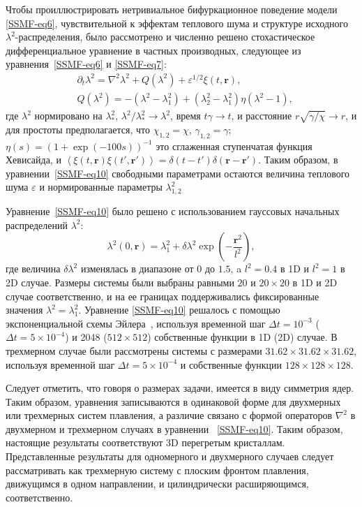 Чтобы проиллюстрировать нетривиальное бифуркационное поведение модели \eqref{SSMF-eq6}, чувствительной к эффектам теплового шума и структуре исходного $\lambda^2$-распределения, было рассмотрено и численно решено стохастическое дифференциальное уравнение в частных производных, следующее из уравнения~\eqref{SSMF-eq6} и \eqref{SSMF-eq7}:
\begin{equation}
\label{SSMF-eq10}
\begin{split}
& \partial_t \lambda^2 = \nabla^2\lambda^2 + Q (\lambda^2) +  \varepsilon^{1/2}\xi(t,\mathbf{r}), \\
& Q(\lambda^2) = -(\lambda^2-\lambda_1^2) + (\lambda_2^2-\lambda_1^2)\eta(\lambda^2-1),
\end{split}
\end{equation}
где $\lambda^2$ нормировано на $\lambda_\ast^2$, $\lambda^2/\lambda^2_\ast \rightarrow \lambda^2$,
время $t\gamma \rightarrow t$, и расстояние  $r \sqrt{\gamma/\chi} \rightarrow r$,
и для простоты предполагается, что $\chi_{1,2}=\chi$, $\gamma_{1,2} = \gamma$;
$\eta(s)=(1+\exp(-100 s ))^{-1}$ это сглаженная ступенчатая функция Хевисайда,
и $\left<\xi(t,\mathbf{r})\xi(t',\mathbf{r}')\right>=\delta(t-t')\delta(\mathbf{r}-\mathbf{r'})$.
Таким образом, в уравнении~\eqref{SSMF-eq10} свободными параметрами остаются величина теплового шума $ \varepsilon $ и нормированные параметры $\lambda^2_{1,2}$

Уравнение~\eqref{SSMF-eq10} было решено с использованием гауссовых начальных распределений $ \lambda ^ 2$:
\begin{equation}
\label{SSMF-eq11}
\lambda^2(0, \mathbf{r}) = \lambda^2_1 + \delta\lambda^2 \exp\left(-\frac{\mathbf{r}^2}{l^2}\right),
\end{equation}
где величина $ \delta\lambda^2$ изменялась в диапазоне от $ 0 $ до $ 1.5 $, a $ l ^ 2 = 0.4 $ в 1D и $ l ^ 2 = 1 $ в 2D случае.
Размеры системы были выбраны равными $20$ и $20 \times 20 $ в 1D и 2D случае соответственно, и на ее границах поддерживались фиксированные значения $\lambda^2= \lambda_1 ^ 2 $.
Уравнение \eqref{SSMF-eq10} решалось с помощью экспоненциальной схемы Эйлера~\cite{10.1098/rspa.2008.0325}, используя временной шаг $\Delta t=10^{-3}$ ($\Delta t=5\times10^{-4}$) и
2048 ($512\times512$) собственные функции в 1D (2D) случае. В трехмерном случае были рассмотрены системы с размерами $31.62 \times 31.62 \times 31.62$, используя временной шаг $\Delta t = 5 \times 10 ^ {-4}$ и собственные функции $128 \times 128 \times 128 $.

Следует отметить, что говоря о размерах задачи, имеется в виду симметрия ядер. Таким образом, уравнения записываются в одинаковой форме для двухмерных или трехмерных систем плавления, а различие связано с формой операторов $\nabla ^ 2$ в двухмерном и трехмерном случаях в уравнении ~\eqref{SSMF-eq10}. Таким образом, настоящие результаты соответствуют 3D перегретым кристаллам. Представленные результаты для одномерного и двухмерного случаев следует рассматривать как трехмерную систему с плоским фронтом плавления, движущимся в одном направлении, и цилиндрически расширяющимся, соответственно.

